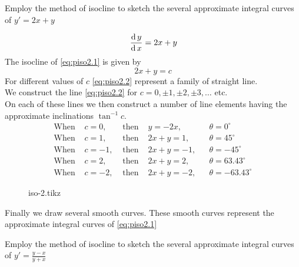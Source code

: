 \documentclass[../main-sheet.tex]{subfiles}
\begin{document}
\begin{prob}
    Employ the method of isocline to sketch the several approximate integral curves of \(y'=2x+y\)
\end{prob}
\begin{soln}
    \begin{equation}
        \,\frac{\mathrm{d}\,y}{\mathrm{d}\,x}=2x+y\label{eq:piso2.1}
    \end{equation}
    The isocline of \eqref{eq:piso2.1} is given by 
    \begin{equation}
        2x+y=c\label{eq:piso2.2}
    \end{equation}
    For different values of \(c\) \eqref{eq:piso2.2} represent a family of straight line.\\
    We construct the line \eqref{eq:piso2.2} for \(c=0,\pm1,\pm2,\pm3,\dots\) etc.\\
    On each of these lines we then construct a number of line elements having the approximate inclinations \(\tan^{-1}c\).\\
    \begin{align*}
        \text{When } & c=0,  & \text{ then } & y=-2x,   &&\theta=0^{\circ}\\
        \text{When } & c=1,  & \text{ then } & 2x+y=1, &&\theta=45^{\circ}\\
        \text{When } & c=-1, & \text{ then } & 2x+y=-1, &&\theta=-45^{\circ}\\
        \text{When } & c=2,  & \text{ then } & 2x+y=2, &&\theta=63.43^{\circ}\\
        \text{When } & c=-2, & \text{ then } & 2x+y=-2, &&\theta=-63.43^{\circ}
    \end{align*}
    \begin{figure}[H]
        \centering
        {iso-2.tikz}
    \end{figure}
    Finally we draw several smooth curves. These smooth curves represent the approximate integral curves of \eqref{eq:piso2.1}
\end{soln}
\begin{prob}
    Employ the method of isocline to sketch the several approximate integral curves of \(y'=\frac{y-x}{y+x}\)
\end{prob}
\end{document}
